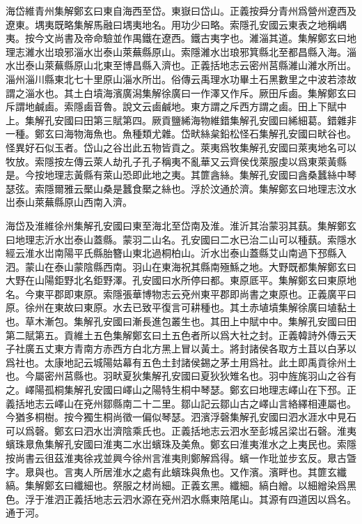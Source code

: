 海岱維青州集解鄭玄曰東自海西至岱。東嶽曰岱山。正義按舜分青州爲營州遼西及遼東。堣夷既略集解馬融曰堣夷地名。用功少曰略。索隱孔安國云東表之地稱嵎夷。按今文尚書及帝命驗並作禺鐵在遼西。鐵古夷字也。濰淄其道。集解鄭玄曰地理志濰水岀琅邪淄水岀泰山萊蕪縣原山。索隱濰水岀琅邪箕縣北至都昌縣入海。淄水岀泰山萊蕪縣原山北東至博昌縣入濟也。正義括地志云密州莒縣濰山濰水所岀。淄州淄川縣東北七十里原山淄水所岀。俗傳云禹理水功畢土石黑數里之中波若漆故謂之淄水也。其土白墳海濱廣潟集解徐廣曰一作澤又作斥。厥田斥鹵。集解鄭玄曰斥謂地鹹鹵。索隱鹵音魯。說文云鹵鹹地。東方謂之斥西方謂之鹵。田上下賦中上。集解孔安國曰田第三賦第四。厥貢鹽絺海物維錯集解孔安國曰絺細葛。錯雜非一種。鄭玄曰海物海魚也。魚種類尤雜。岱畎絲枲鉛松怪石集解孔安國曰畎谷也。怪異好石似玉者。岱山之谷岀此五物皆貢之。萊夷爲牧集解孔安國曰萊夷地名可以牧放。索隱按左傳云萊人劫孔子孔子稱夷不亂華又云齊侯伐萊服虔以爲東萊黃縣是。今按地理志黃縣有萊山恐即此地之夷。其篚酓絲。集解孔安國曰酓桑蠶絲中琴瑟弦。索隱爾雅云檿山桑是蠶食檿之絲也。浮於汶通於濟。集解鄭玄曰地理志汶水岀泰山萊蕪縣原山西南入濟。

海岱及淮維徐州集解孔安國曰東至海北至岱南及淮。淮沂其治蒙羽其蓺。集解鄭玄曰地理志沂水岀泰山蓋縣。蒙羽二山名。孔安國曰二水已治二山可以種蓺。索隱水經云淮水岀南陽平氏縣胎簪山東北過桐柏山。沂水岀泰山蓋縣艾山南過下邳縣入泗。蒙山在泰山蒙陰縣西南。羽山在東海祝其縣南殛鯀之地。大野既都集解鄭玄曰大野在山陽鉅野北名鉅野澤。孔安國曰水所停曰都。東原厎平。集解鄭玄曰東原地名。今東平郡即東原。索隱張華博物志云兗州東平郡即尚書之東原也。正義廣平曰原。徐州在東故曰東原。水去已致平復言可耕種也。其土赤埴墳集解徐廣曰埴黏土也。草木漸包。集解孔安國曰漸長進包叢生也。其田上中賦中中。集解孔安國曰田第二賦第五。貢維土五色集解鄭玄曰土五色者所以爲大社之封。正義韓詩外傳云天子社廣五丈東方青南方赤西方白北方黑上冒以黃土。將封諸侯各取方土苴以白茅以爲社也。太康地記云城陽姑幕有五色土封諸侯錫之茅土用爲社。此土即禹貢徐州土也。今屬密州莒縣也。羽畎夏狄集解孔安國曰夏狄狄雉名也。羽中旌旄羽山之谷有之。嶧陽孤桐集解孔安國曰嶧山之陽特生桐中琴瑟。鄭玄曰地理志嶧山在下邳。正義括地志云嶧山在兗州鄒縣南二十二里。鄒山記云鄒山古之嶧山言絡繹相連屬也。今猶多桐樹。按今獨生桐尚徵一偏似琴瑟。泗濱浮磬集解孔安國曰泗水涯水中見石可以爲磬。鄭玄曰泗水岀濟陰乘氏也。正義括地志云泗水至彭城呂梁岀石磬。淮夷蠙珠臮魚集解孔安國曰淮夷二水岀蠙珠及美魚。鄭玄曰淮夷淮水之上夷民也。索隱按尚書云徂茲淮夷徐戎並興今徐州言淮夷則鄭解爲得。蠙一作玭並步玄反。臮古曁字。臮與也。言夷人所居淮水之處有此蠙珠與魚也。又作濱。濱畔也。其篚玄纖縞。集解鄭玄曰纖細也。祭服之材尚細。正義玄黑。纖細。縞白繒。以細繒染爲黑色。浮于淮泗正義括地志云泗水源在兗州泗水縣東陪尾山。其源有四道因以爲名。通于河。


